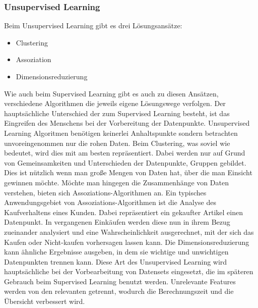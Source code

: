 \documentclass[12pt,german,ngerman]{report}
\begin{document}
        \subsubsection{Unsupervised Learning}
            Beim Unsupervised Learning gibt es drei Lösungsansätze:\cite{unsupervisedlearning2021ibm}
            \begin{itemize}
                \item{Clustering}
                \item{Assoziation}
                \item{Dimensionsreduzierung}
            \end{itemize}
            Wie auch beim Supervised Learning gibt es auch zu diesen Ansätzen, verschiedene
            Algorithmen die jeweils eigene Lösungswege verfolgen.
            Der hauptsächliche Unterschied der zum Supervised Learning besteht, ist das Eingreifen
            des Menschens bei der Vorbereitung der Datenpunkte. Unsupervised Learning Algoritmen
            benötigen keinerlei Anhaltspunkte sondern betrachten unvoreingenommen  nur die rohen Daten.
            Beim Clustering, was soviel wie  bedeutet, wird dies mit am besten repräsentiert.
            Dabei werden nur auf Grund von Gemeinsamkeiten und Unterschieden der Datenpunkte, Gruppen gebildet.\cite{clustering2021elementai}
            Dies ist nützlich wenn man große Mengen von Daten hat, über die man Einsicht gewinnen möchte.
            Möchte man hingegen die Zusammenhänge von Daten verstehen, 
            bieten sich Assoziations-Algorithmen an.\cite{apriori2019sciencedata}
            Ein typisches Anwendungsgebiet von Assoziations-Algorithmen ist die Analyse des Kaufverhaltens eines Kunden.
            Dabei repräsentiert ein gekaufter Artikel einen Datenpunkt. In vergangenen Einkäufen werden diese nun 
            in ihrem Bezug zueinander analysiert und eine Wahrscheinlichkeit ausgerechnet, mit der sich
            das Kaufen oder Nicht-kaufen vorhersagen lassen kann. Die Dimensionsreduzierung kann
            ähnliche Ergebnisse ausgeben, in dem sie wichtige und unwichtigen Datenpunkten trennen kann.
            Diese Art des Unsupervised Learning wird hauptsächliche bei der Vorbearbeitung von Datensets eingesetzt,
            die im späteren Gebrauch beim Supervised Learning benutzt werden.\cite{unsupervisedlearning2021ibm}
            Unrelevante Features werden von den relevanten getrennt, wodurch die Berechnungszeit und die Übersicht
            verbessert wird.
            
\end{document}
